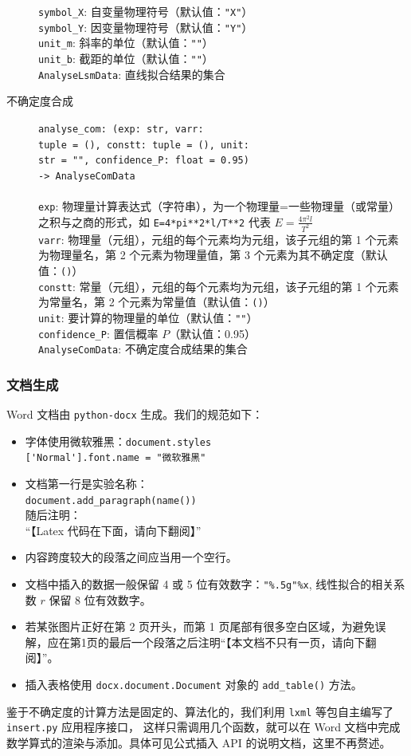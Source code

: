 \begin{description}
  \verb|symbol_X|: 自变量物理符号（默认值：\verb|"X"|）\\
  \verb|symbol_Y|: 因变量物理符号（默认值：\verb|"Y"|）\\
  \verb|unit_m|: 斜率的单位（默认值：\verb|""|）\\
  \verb|unit_b|: 截距的单位（默认值：\verb|""|）\\
  \verb|AnalyseLsmData|: 直线拟合结果的集合
  \item[不确定度合成] \verb|analyse_com: (exp: str, varr:|\\\verb|tuple = (), constt: tuple = (), unit:|\\\verb|str = "", confidence_P: float = 0.95)|\\\verb|-> AnalyseComData|\\
  \\
  \verb|exp|: 物理量计算表达式（字符串），为一个物理量=一些物理量（或常量）之积与之商的形式，如 \verb|E=4*pi**2*l/T**2| 代表 \(E=\frac{4\pi^2l}{T^2}\)\\
  \verb|varr|: 物理量（元组），元组的每个元素均为元组，该子元组的第 1 个元素为物理量名，第 2 个元素为物理量值，第 3 个元素为其不确定度（默认值：\verb|()|）\\
  \verb|constt|: 常量（元组），元组的每个元素均为元组，该子元组的第 1 个元素为常量名，第 2 个元素为常量值（默认值：\verb|()|）\\
  \verb|unit|: 要计算的物理量的单位（默认值：\verb|""|）\\
  \verb|confidence_P|: 置信概率 \(P\)（默认值：0.95）\\
  \verb|AnalyseComData|: 不确定度合成结果的集合
\end{description}

\subsubsection{文档生成}

Word 文档由 \verb|python-docx| 生成。我们的规范如下：
\begin{itemize}
  \item 字体使用微软雅黑：\verb|document.styles|\\\verb|['Normal'].font.name = "微软雅黑"|
  \item 文档第一行是实验名称：\\\verb|document.add_paragraph(name())|\\随后注明：\\“【Latex 代码在下面，请向下翻阅】”
  \item 内容跨度较大的段落之间应当用一个空行。
  \item 文档中插入的数据一般保留 4 或 5 位有效数字：\verb|"%.5g"%x|, 线性拟合的相关系数 \(r\) 保留 8 位有效数字。
  \item 若某张图片正好在第 2 页开头，而第 1 页尾部有很多空白区域，为避免误解，应在第1页的最后一个段落之后注明“【本文档不只有一页，请向下翻阅】”。
  \item 插入表格使用 \verb|docx.document.Document| 对象的 \verb|add_table()| 方法。
\end{itemize}

鉴于不确定度的计算方法是固定的、算法化的，我们利用 \verb|lxml| 等包自主编写了 \verb|insert.py| 应用程序接口，
这样只需调用几个函数，就可以在 Word 文档中完成数学算式的渲染与添加。具体可见公式插入 API 的说明文档，这里不再赘述。